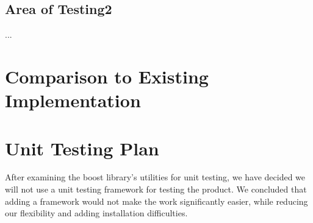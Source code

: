 \documentclass[12pt, titlepage]{article}
\begin{document}
\subsection{Area of Testing2}

...

	
\section{Comparison to Existing Implementation}	
				
\section{Unit Testing Plan}
	
	After examining the boost library's utilities for unit testing, we have decided we will not use a unit testing framework for testing the product. We concluded that adding a framework would not make the work significantly easier, while reducing our flexibility and adding installation difficulties.
	
\end{document}
